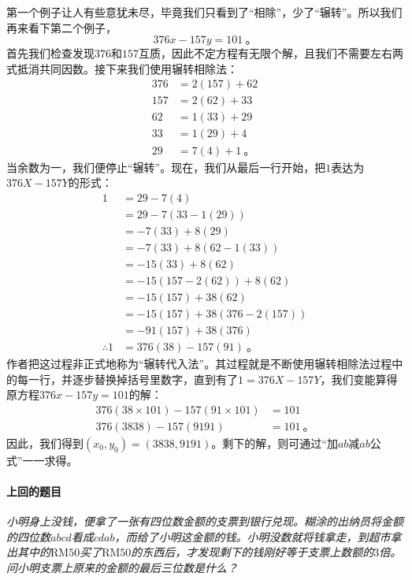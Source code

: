 \documentclass[a4,12pt]{article}
\begin{document}
	第一个例子让人有些意犹未尽，毕竟我们只看到了“相除”，少了“辗转”。所以我们再来看下第二个例子，
	\[ 376x - 157y = 101 \ \mbox{。} \]
	首先我们检查发现$376$和$157$互质，因此不定方程有无限个解，且我们不需要左右两式抵消共同因数。接下来我们使用辗转相除法：
	\[ \begin{aligned}
			376 &= 2(157) + 62 \\
			157 &= 2(62) + 33 \\
			62 &= 1(33) + 29 \\
			33 &= 1(29) + 4 \\
			29 &= 7(4) + 1 \ \mbox{。}
		\end{aligned}
	\]
	当余数为一，我们便停止“辗转”。现在，我们从最后一行开始，把$1$表达为$376X-157Y$的形式：
	\[ \begin{aligned}
			1
			&= 29 - 7(4) \\
			&= 29 - 7(33 - 1(29)) \\
			&= -7(33) + 8(29) \\
			&= -7(33) + 8(62 - 1(33)) \\
			&= -15(33) + 8(62) \\
			&= -15(157 - 2(62)) + 8(62) \\
			&= -15(157) + 38(62) \\
			&= -15(157) + 38(376 - 2(157)) \\
			&= -91(157) + 38(376) \\
			\therefore 1 &= 376(38) - 157(91) \ \mbox{。}
		\end{aligned}
	\]
	作者把这过程非正式地称为“辗转代入法”。其过程就是不断使用辗转相除法过程中的每一行，并逐步替换掉括号里数字，直到有了$1=376X-157Y$，我们变能算得原方程$376x - 157y = 101$的解：
	\[ \begin{aligned}
			376(38\times101) - 157(91\times101) &= 101 \\
			376(3838) - 157(9191) &= 101 \ \mbox{。}
		\end{aligned}
	\]
	因此，我们得到$(x_0, y_0) = (3838, 9191)$。剩下的解，则可通过“加$ab$减$ab$公式”一一求得。

\paragraph{上回的题目}
\emph{
	小明身上没钱，便拿了一张有四位数金额的支票到银行兑现。糊涂的出纳员将金额的四位数$abcd$看成$cdab$，而给了小明这金额的钱。小明没数就将钱拿走，到超市拿出其中的$\mathrm{RM}50$买了$\mathrm{RM}50$的东西后，才发现剩下的钱刚好等于支票上数额的$3$倍。问小明支票上原来的金额的最后三位数是什么？
	}
\end{document}

